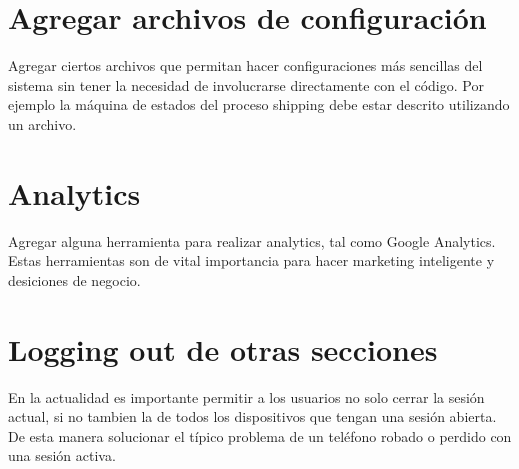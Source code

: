 	\section{Agregar archivos de configuración}
		Agregar ciertos archivos que permitan hacer configuraciones más sencillas del sistema sin tener la necesidad de involucrarse directamente con el código.
		Por ejemplo la máquina de estados del proceso shipping debe estar descrito utilizando un archivo.

	\section{Analytics}

		Agregar alguna herramienta para realizar analytics, tal como Google Analytics.
		Estas herramientas son de vital importancia para hacer marketing inteligente y desiciones de negocio.

	\section{Logging out de otras secciones}
		En la actualidad es importante permitir a los usuarios no solo cerrar la sesión actual, si no tambien la de todos los dispositivos que tengan una sesión abierta. De esta manera solucionar el típico problema de un teléfono robado o perdido con una sesión activa.





